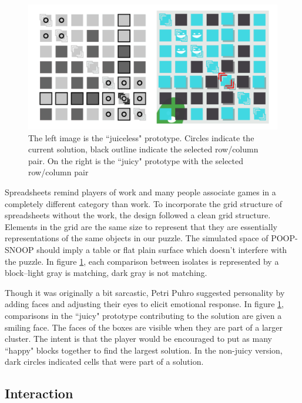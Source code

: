 \begin{figure}
\begin{center}
\includegraphics[width=150mm]{images/grid.pdf}
\caption{The left image is the ``juiceless" prototype. Circles indicate the current solution, black outline indicate the selected row/column pair. On the right is the ``juicy" prototype with the selected row/column pair}
\label{fig:grid}
\end{center}
\end{figure}

Spreadsheets remind players of work and many people associate games in a completely different category than work. To incorporate the grid structure of spreadsheets without the work, the design followed a clean grid structure. Elements in the grid are the same size to represent that they are essentially representations of the same objects in our puzzle. The simulated space of POOP-SNOOP should imply a table or flat plain surface which doesn't interfere with the puzzle. In figure \ref{fig:grid}, each comparison between isolates is represented by a block--light gray is matching, dark gray is not matching.

Though it was originally a bit sarcastic, Petri Puhro \cite{juiceitorloseit} suggested personality by adding faces and adjusting their eyes to elicit emotional response. In figure \ref{fig:grid}, comparisons in the ``juicy" prototype contributing to the solution are given a smiling face. The faces of the boxes are visible when they are part of a larger cluster. The intent is that the player would be encouraged to put as many ``happy" blocks together to find the largest solution. In the non-juicy version, dark circles indicated cells that were part of a solution.

\subsection{Interaction}

